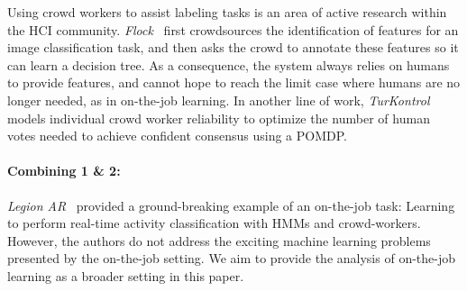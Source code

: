 Using crowd workers to assist labeling tasks is an area of active research within the HCI community.
\textit{Flock}~\cite{cheng2015flock} first crowdsources the identification of features for an image classification task, and then asks the crowd to annotate these features so it can learn a decision tree.
As a consequence, the system always relies on humans to provide features, and cannot hope to reach the limit case where humans are no longer needed, as in on-the-job learning.
In another line of work, \textit{TurKontrol}~\cite{dai2010decision} models individual crowd worker reliability to optimize the number of human votes needed to achieve confident consensus using a POMDP\@.

\paragraph{Combining 1 \& 2:}

\textit{Legion AR}~\cite{lasecki2013real} provided a ground-breaking example of an on-the-job task: Learning to perform real-time activity classification with HMMs and crowd-workers.
However, the authors do not address the exciting machine learning problems presented by the on-the-job setting.
We aim to provide the analysis of on-the-job learning as a broader setting in this paper.




